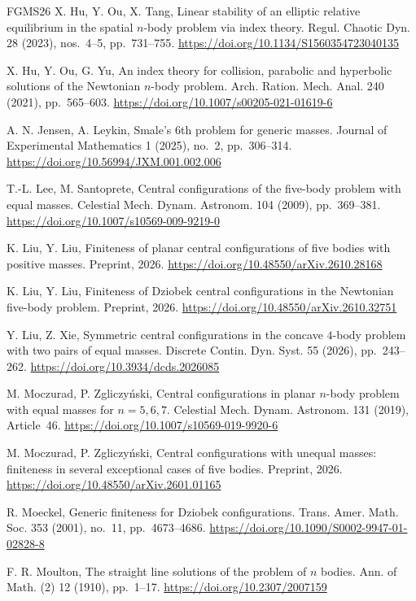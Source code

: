 \documentclass[Threeside,11pt]{article}
\theoremstyle{definition}
\theoremstyle{remark}
\numberwithin{equation}{section}
\theoremstyle{remark}
\begin{document}
\begin{thebibliography}{FGMS26}
X. Hu, Y. Ou, X. Tang,
Linear stability of an elliptic relative equilibrium
in the spatial $n$-body problem via index theory.
Regul. Chaotic Dyn. 28 (2023), nos.~4--5, pp.~731--755.
\url{https://doi.org/10.1134/S1560354723040135}

X. Hu, Y. Ou, G. Yu,
An index theory for collision, parabolic and hyperbolic
solutions of the Newtonian $n$-body problem.
Arch. Ration. Mech. Anal. 240 (2021), pp.~565--603.
\url{https://doi.org/10.1007/s00205-021-01619-6}

A. N. Jensen, A. Leykin,
Smale's 6th problem for generic masses.
Journal of Experimental Mathematics 1 (2025), no.~2, pp.~306--314.
\url{https://doi.org/10.56994/JXM.001.002.006}

T.-L. Lee, M. Santoprete,
Central configurations of the five-body problem with equal
masses.
Celestial Mech. Dynam. Astronom. 104 (2009), pp.~369--381.
\url{https://doi.org/10.1007/s10569-009-9219-0}

K. Liu, Y. Liu,
Finiteness of planar central configurations of five bodies
with positive masses.
Preprint, 2026.
\url{https://doi.org/10.48550/arXiv.2610.28168}

K. Liu, Y. Liu,
Finiteness of Dziobek central configurations in the
Newtonian five-body problem.
Preprint, 2026.
\url{https://doi.org/10.48550/arXiv.2610.32751}

Y. Liu, Z. Xie,
Symmetric central configurations in the concave $4$-body problem with two pairs of equal masses.
Discrete Contin. Dyn. Syst. 55 (2026), pp.~243--262.
\url{https://doi.org/10.3934/dcds.2026085}

M. Moczurad, P. Zgliczy\'nski,
Central configurations in planar $n$-body problem with
equal masses for $n=5,6,7$.
Celestial Mech. Dynam. Astronom. 131 (2019), Article~46.
\url{https://doi.org/10.1007/s10569-019-9920-6}

M. Moczurad, P. Zgliczy\'nski,
Central configurations with unequal masses: finiteness
in several exceptional cases of five bodies.
Preprint, 2026.
\url{https://doi.org/10.48550/arXiv.2601.01165}

R. Moeckel,
Generic finiteness for Dziobek configurations.
Trans. Amer. Math. Soc. 353 (2001), no.~11, pp.~4673--4686.
\url{https://doi.org/10.1090/S0002-9947-01-02828-8}

F. R. Moulton,
The straight line solutions of the problem of $n$ bodies.
Ann. of Math. (2) 12 (1910), pp.~1--17.
\url{https://doi.org/10.2307/2007159}


\end{thebibliography}
\end{document}
